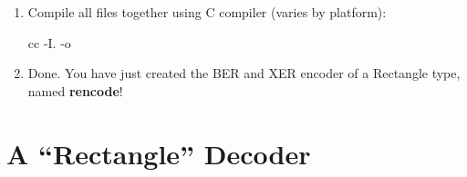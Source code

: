 \documentclass[english,oneside,12pt]{book}
\begin{document}
\begin{enumerate}
\begin{example}
{    /* Initialize the Rectangle members */
    rectangle->height = 42;  /* any random value */
    rectangle->width  = 23;  /* any random value */

    /* BER encode the data if filename is given */
    if(ac < 2) {
        fprintf(stderr, "Specify filename for BER output\n");
    } else {
        const char *filename = av[1];
        FILE *fp = fopen(filename, "wb");   /* for BER output */
 
        if(!fp) {
          perror(filename);
          exit(1);
        }

        /* Encode the Rectangle type as BER (DER) */
        ec = der_encode(&asn_DEF_Rectangle, rectangle, write_out, fp);
        fclose(fp);
        if(ec.encoded == -1) {
          fprintf(stderr, "Could not encode Rectangle (at %
              ec.failed_type ? ec.failed_type->name : "unknown");
          exit(1);
        } else {
          fprintf(stderr, "Created %
        }
    }

    /* Also print the constructed Rectangle XER encoded (XML) */
    xer_fprint(stdout, &asn_DEF_Rectangle, rectangle);

    return 0; /* Encoding finished successfully */
 }
\end{example}
\item Compile all files together using C compiler (varies by platform):

\begin{bash}
cc -I. -o %
\end{bash}
\item Done. You have just created the BER and XER encoder of a Rectangle
type, named \textbf{rencode}!
\end{enumerate}

\section{\label{sec:A-Rectangle-Decoder}A “Rectangle” Decoder}
\end{document}
